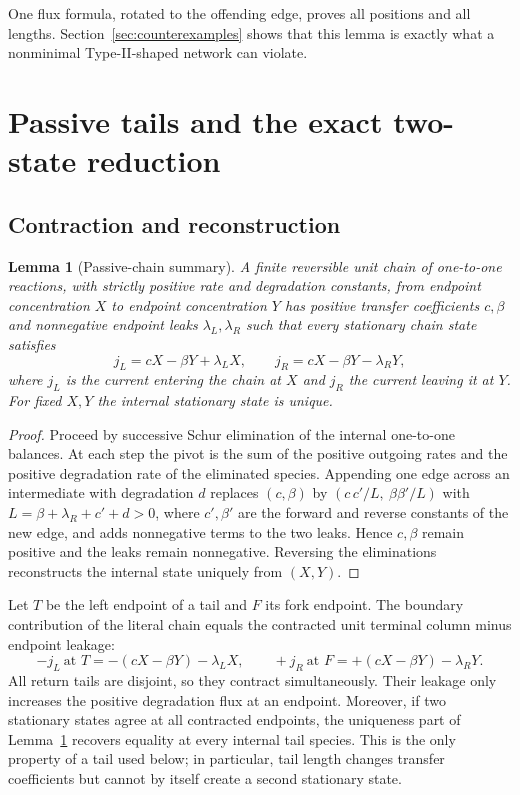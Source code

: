 \documentclass[11pt,reqno]{amsart}
\theoremstyle{plain}
\newtheorem{lemma}[theorem]{Lemma}
\theoremstyle{definition}
\theoremstyle{remark}
\numberwithin{equation}{section}
\begin{document}
One flux formula, rotated to the offending edge, proves all positions and all lengths.  Section~\ref{sec:counterexamples} shows that this lemma is exactly what a nonminimal Type-II-shaped network can violate.

\section{Passive tails and the exact two-state reduction}\label{sec:tails}

\subsection{Contraction and reconstruction}

\begin{lemma}[Passive-chain summary]\label{lem:chain}
A finite reversible unit chain of one-to-one reactions, with strictly positive rate and degradation constants, from endpoint concentration $X$ to endpoint concentration $Y$ has positive transfer coefficients $c,\beta$ and nonnegative endpoint leaks $\lambda_L,\lambda_R$ such that every stationary chain state satisfies
\begin{equation}\label{eq:twoport}
j_L=cX-\beta Y+\lambda_LX,\qquad j_R=cX-\beta Y-\lambda_RY,
\end{equation}
where $j_L$ is the current entering the chain at $X$ and $j_R$ the current leaving it at $Y$.  For fixed $X,Y$ the internal stationary state is unique.
\end{lemma}

\begin{proof}
Proceed by successive Schur elimination of the internal one-to-one balances.  At each step the pivot is the sum of the positive outgoing rates and the positive degradation rate of the eliminated species.  Appending one edge across an intermediate with degradation $d$ replaces $(c,\beta)$ by $(c\,c'/L,\ \beta\beta'/L)$ with $L=\beta+\lambda_R+c'+d>0$, where $c',\beta'$ are the forward and reverse constants of the new edge, and adds nonnegative terms to the two leaks.  Hence $c,\beta$ remain positive and the leaks remain nonnegative.  Reversing the eliminations reconstructs the internal state uniquely from $(X,Y)$.
\end{proof}

Let $T$ be the left endpoint of a tail and $F$ its fork endpoint.  The boundary contribution of the literal chain equals the contracted unit terminal column minus endpoint leakage:
\begin{equation}\label{eq:boundary}
-j_L\ \text{at }T=-(cX-\beta Y)-\lambda_LX,\qquad
+j_R\ \text{at }F=+(cX-\beta Y)-\lambda_RY .
\end{equation}
All return tails are disjoint, so they contract simultaneously.  Their leakage only increases the positive degradation flux at an endpoint.  Moreover, if two stationary states agree at all contracted endpoints, the uniqueness part of Lemma~\ref{lem:chain} recovers equality at every internal tail species.  This is the only property of a tail used below; in particular, tail length changes transfer coefficients but cannot by itself create a second stationary state.
\end{document}

